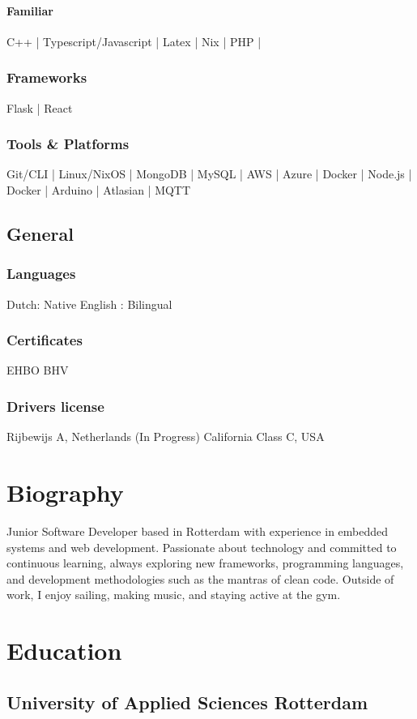 \documentclass{article}
\begin{document}
\paragraph{Familiar}
	C++ | Typescript/Javascript | Latex | Nix | PHP |
\subsubsection{Frameworks}
	Flask | React
\subsubsection{Tools \& Platforms}
	Git/CLI | Linux/NixOS | MongoDB | MySQL | AWS | Azure | Docker | Node.js | Docker | Arduino | Atlasian | MQTT

\subsection{General}

\subsubsection{Languages}
Dutch: Native
English : Bilingual
\subsubsection{Certificates}
EHBO
BHV
\subsubsection{Drivers license}
Rijbewijs A, Netherlands (In Progress)
California Class C, USA

\section{Biography}
Junior Software Developer based in Rotterdam with experience in embedded systems and web development. Passionate about technology and committed to continuous learning, always exploring new frameworks, programming languages, and development methodologies such as the mantras of clean code. Outside of work, I enjoy sailing, making music, and staying active at the gym.

\section{Education}
\subsection{University of Applied Sciences Rotterdam}
\end{document}
